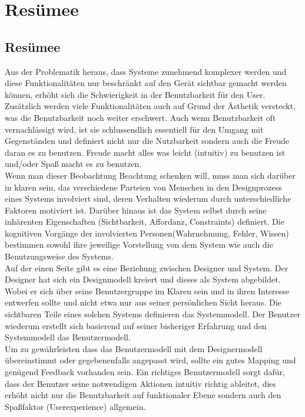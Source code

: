 \documentclass[parskip,headsepline, headtopline, %
footsepline, oneside, 12pt, headings=small]{scrreprt}
\begin{document}
 
\chapter{Resümee}
\section{Resümee}

Aus der Problematik heraus, dass Systeme zunehmend komplexer werden und diese Funktionalitäten nur beschränkt auf den Gerät sichtbar gemacht werden können, erhöht sich die Schwierigkeit in der Benutzbarkeit für den User. Zusätzlich werden viele Funktionalitäten auch auf Grund der Ästhetik versteckt, was die  Benutzbarkeit noch weiter erschwert. Auch wenn Benutzbarkeit oft vernachlässigt wird, ist sie schlussendlich essentiell für den Umgang mit Gegenständen und definiert nicht nur die Nutzbarkeit sondern auch die Freude daran es zu benutzen. Freude macht alles was leicht (intuitiv) zu benutzen ist und/oder Spaß macht es zu benutzen. \\
Wenn man dieser Beobachtung Beachtung schenken will, muss man sich darüber in klaren sein, das verschiedene Parteien von Menschen in den Designprozess  eines Systems involviert sind, deren Verhalten wiederum durch unterschiedliche Faktoren motiviert ist. Darüber hinaus ist das System selbst durch seine inhärenten Eigenschaften (Sichtbarkeit, Affordanz, Constraints) definiert. Die kognitiven Vorgänge der involvierten Personen(Wahrnehmung, Fehler, Wissen) bestimmen sowohl ihre jeweilige Vorstellung von dem System wie auch die Benutzungsweise des Systems. \\ 
Auf der einen Seite gibt es eine Beziehung zwischen Designer und System. Der Designer hat sich ein Designmodell kreiert und dieses als System abgebildet. Wobei er sich über seine Benutzergruppe im Klaren sein und in ihren Interesse entwerfen sollte und nicht etwa nur aus seiner persönlichen Sicht heraus.
Die sichtbaren Teile eines solchen Systems definieren das Systemmodell. Der Benutzer wiederum erstellt sich basierend auf seiner bisheriger Erfahrung und den Systemmodell das Benutzermodell.\\
Um zu gewährleisten dass das Benutzermodell mit dem Designermodell übereinstimmt oder gegebenenfalls angepasst wird, sollte ein gutes Mapping und genügend Feedback vorhanden sein. Ein richtiges Benutzermodell sorgt dafür, dass der Benutzer seine notwendigen Aktionen intuitiv richtig ableitet, dies erhöht nicht nur die Benutzbarkeit auf funktionaler Ebene sondern auch den Spaßfaktor (Userexperience) allgemein. \\ 
\end{document}

